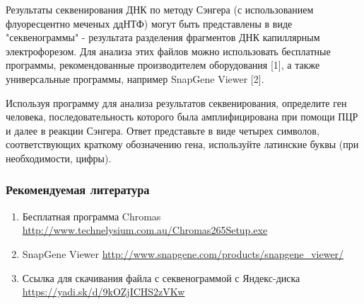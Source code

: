 
Результаты секвенирования ДНК по методу Сэнгера (с использованием флуоресцентно меченых ддНТФ) могут быть представлены в виде "секвенограммы" - результата разделения фрагментов ДНК капиллярным электрофорезом. Для анализа этих файлов можно использовать бесплатные программы, рекомендованные производителем оборудования [1], а также универсальные программы, например SnapGene Viewer [2].

Используя программу для анализа результатов секвенирования, определите ген человека, последовательность которого была амплифицирована при помощи ПЦР и далее в реакции Сэнгера. Ответ представьте в виде четырех символов, соответствующих краткому ﻿обозначению гена, используйте латинские буквы (при необходимости, цифры).

\subsubsection*{Рекомендуемая литература}

\begin{enumerate}
    \item Бесплатная программа Chromas\\ \url{http://www.technelysium.com.au/Chromas265Setup.exe}
    \item SnapGene Viewer \url{http://www.snapgene.com/products/snapgene_viewer/}
    \item Ссылка для скачивания файла с секвенограммой с Яндекс-диска  \url{https://yadi.sk/d/9kOZjICHS2zVKw} 
\end{enumerate}